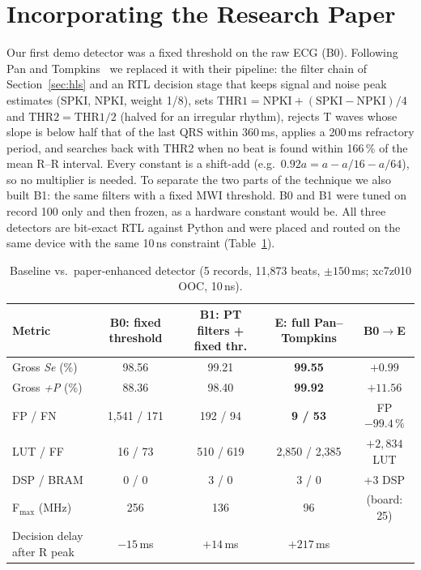 \documentclass[11pt,a4paper]{article}
\newcommand{\Se}{\textit{Se}}
\newcommand{\Pp}{\textit{+P}}
\begin{document}
\section{Incorporating the Research Paper}
\label{sec:paper}
Our first demo detector was a fixed threshold on the raw ECG (B0). Following Pan and
Tompkins~\cite{pan} we replaced it with their pipeline: the filter chain of Section~\ref{sec:hls} and
an RTL decision stage that keeps signal and noise peak estimates (SPKI, NPKI, weight 1/8), sets
$\mathrm{THR1}=\mathrm{NPKI}+(\mathrm{SPKI}-\mathrm{NPKI})/4$ and $\mathrm{THR2}=\mathrm{THR1}/2$
(halved for an irregular rhythm), rejects T waves whose slope is below half that of the last QRS
within 360\,ms, applies a 200\,ms refractory period, and searches back with THR2 when no beat is found
within 166\,\% of the mean R--R interval. Every constant is a shift-add (e.g.\
$0.92a=a-a/16-a/64$), so no multiplier is needed. To separate the two parts of the technique we also
built B1: the same filters with a fixed MWI threshold. B0 and B1 were tuned on record 100 only and then
frozen, as a hardware constant would be. All three detectors are bit-exact RTL against Python and were
placed and routed on the same device with the same 10\,ns constraint (Table~\ref{tab:paper}).

\begin{table}[!tbp]\centering\footnotesize\setlength{\tabcolsep}{3.5pt}
\caption{Baseline vs.\ paper-enhanced detector (5 records, 11{,}873 beats, $\pm150$\,ms; xc7z010 OOC, 10\,ns).}\label{tab:paper}
\begin{tabular}{@{}lcccc@{}}
\toprule
Metric & B0: fixed threshold & B1: PT filters + fixed thr. & E: full Pan--Tompkins & B0$\rightarrow$E\\
\midrule
Gross \Se{} (\%) & 98.56 & 99.21 & \textbf{99.55} & $+0.99$\\
Gross \Pp{} (\%) & 88.36 & 98.40 & \textbf{99.92} & $+11.56$\\
FP / FN & 1{,}541 / 171 & 192 / 94 & \textbf{9 / 53} & FP $-99.4\,\%$\\
LUT / FF & 16 / 73 & 510 / 619 & 2{,}850 / 2{,}385 & $+2{,}834$ LUT\\
DSP / BRAM & 0 / 0 & 3 / 0 & 3 / 0 & +3 DSP\\
F$_\text{max}$ (MHz) & 256 & 136 & 96 & (board: 25)\\
Decision delay after R peak & $-15$\,ms & $+14$\,ms & $+217$\,ms & \\
\bottomrule
\end{tabular}
\end{table}
\end{document}
